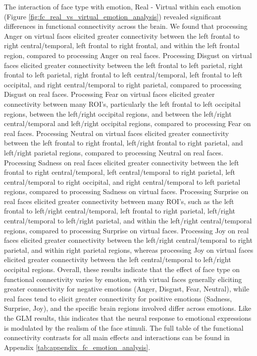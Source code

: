 The interaction of face type with emotion, Real - Virtual within each emotion (Figure \ref{fig:fc_real_vs_virtual_emotion_analysis}) revealed significant differences in functional connectivity across the brain.
We found that processing Anger on virtual faces elicited greater connectivity between the left frontal to right central/temporal, left frontal to right frontal, and within the left frontal region, compared to processing Anger on real faces.
Processing Disgust on virtual faces elicited greater connectivity between the left frontal to left parietal, right frontal to left parietal, right frontal to left central/temporal, left frontal to left occipital, and right central/temporal to right parietal, compared to processing Disgust on real faces.
Processing Fear on virtual faces elicited greater connectivity between many ROI's, particularly the left frontal to left occipital regions, between the left/right occipital regions, and between the left/right central/temporal and left/right occipital regions, compared to processing Fear on real faces.
Processing Neutral on virtual faces elicited greater connectivity between the left frontal to right frontal, left/right frontal to right parietal, and left/right parietal regions, compared to processing Neutral on real faces.
Processing Sadness on real faces elicited greater connectivity between the left frontal to right central/temporal, left central/temporal to right parietal, left central/temporal to right occipital, and right central/temporal to left parietal regions, compared to processing Sadness on virtual faces.
Processing Surprise on real faces elicited greater connectivity between many ROI's, such as the left frontal to left/right central/temporal, left frontal to right parietal, left/right central/temporal to left/right parietal, and within the left/right central/temporal regions, compared to processing Surprise on virtual faces.
Processing Joy on real faces elicited greater connectivity between the left/right central/temporal to right parietal, and within right parietal regions, whereas processing Joy on virtual faces elicited greater connectivity between the left central/temporal to left/right occipital regions. 
Overall, these results indicate that the effect of face type on functional connectivity varies by emotion, with virtual faces generally eliciting greater connectivity for negative emotions (Anger, Disgust, Fear, Neutral), while real faces tend to elicit greater connectivity for positive emotions (Sadness, Surprise, Joy), and the specific brain regions involved differ across emotions.
Like the GLM results, this indicates that the neural response to emotional expressions is modulated by the realism of the face stimuli. 
The full table of the functional connectivity contrasts for all main effects and interactions can be found in Appendix \ref{tab:appendix_fc_emotion_analysis}.

